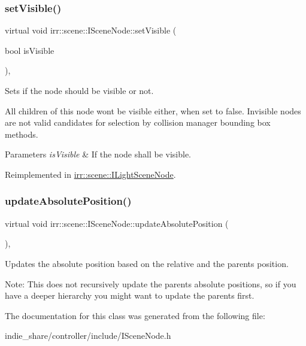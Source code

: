 \subsubsection{\texorpdfstring{set\+Visible()}{setVisible()}}
{\footnotesize\ttfamily virtual void irr\+::scene\+::\+I\+Scene\+Node\+::set\+Visible (\begin{DoxyParamCaption}\item[{bool}]{is\+Visible }\end{DoxyParamCaption})\hspace{0.3cm}{\ttfamily [inline]}, {\ttfamily [virtual]}}



Sets if the node should be visible or not. 

All children of this node won\textquotesingle{}t be visible either, when set to false. Invisible nodes are not valid candidates for selection by collision manager bounding box methods. 
\begin{DoxyParams}{Parameters}
{\em is\+Visible} & If the node shall be visible. \\
\hline
\end{DoxyParams}


Reimplemented in \hyperlink{classirr_1_1scene_1_1ILightSceneNode_a3a6a6681a665ec4c214cda8a84a29337}{irr\+::scene\+::\+I\+Light\+Scene\+Node}.

\mbox{\label{classirr_1_1scene_1_1ISceneNode_aeb6e0dc034bb2101600ce87acbcf0f6e}} 
\subsubsection{\texorpdfstring{update\+Absolute\+Position()}{updateAbsolutePosition()}}
{\footnotesize\ttfamily virtual void irr\+::scene\+::\+I\+Scene\+Node\+::update\+Absolute\+Position (\begin{DoxyParamCaption}{ }\end{DoxyParamCaption})\hspace{0.3cm}{\ttfamily [inline]}, {\ttfamily [virtual]}}



Updates the absolute position based on the relative and the parents position. 

Note\+: This does not recursively update the parents absolute positions, so if you have a deeper hierarchy you might want to update the parents first. 

The documentation for this class was generated from the following file\+:\begin{DoxyCompactItemize}
\item 
indie\+\_\+share/controller/include/I\+Scene\+Node.\+h\end{DoxyCompactItemize}
